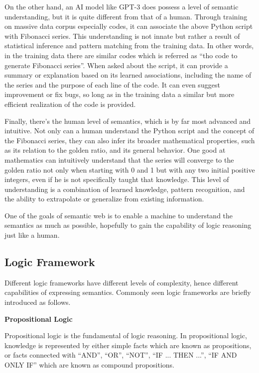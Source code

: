 On the other hand, an AI model like GPT-3 does possess a level of semantic understanding, but it is quite different from that of a human. Through training on massive data corpus especially codes, it can associate the above Python script with Fibonacci series. This understanding is not innate but rather a result of statistical inference and pattern matching from the training data. In other words, in the training data there are similar codes which is referred as ``tho code to generate Fibonacci series''. When asked about the script, it can provide a summary or explanation based on its learned associations, including the name of the series and the purpose of each line of the code. It can even suggest improvement or fix bugs, so long as in the training data a similar but more efficient realization of the code is provided.

Finally, there's the human level of semantics, which is by far most advanced and intuitive. Not only can a human understand the Python script and the concept of the Fibonacci series, they can also infer its broader mathematical properties, such as its relation to the golden ratio, and its general behavior. One good at mathematics can intuitively understand that the series will converge to the golden ratio not only when starting with 0 and 1 but with any two initial positive integers, even if he is not specifically taught that knowledge. This level of understanding is a combination of learned knowledge, pattern recognition, and the ability to extrapolate or generalize from existing information.

One of the goals of semantic web is to enable a machine to understand the semantics as much as possible, hopefully to gain the capability of logic reasoning just like a human. 

\subsection{Logic Framework} \label{subsec:knowledgeandlogic}

Different logic frameworks have different levels of complexity, hence different capabilities of expressing semantics. Commonly seen logic frameworks are briefly introduced as follows.

\vspace{0.1in}
\noindent \textbf{Propositional Logic}
\vspace{0.1in}

Propositional logic is the fundamental of logic reasoning. In propositional logic, knowledge is represented by either simple facts which are known as propositions, or facts connected with ``AND'', ``OR'', ``NOT'', ``IF ... THEN ...'', ``IF AND ONLY IF'' which are known as compound propositions.

